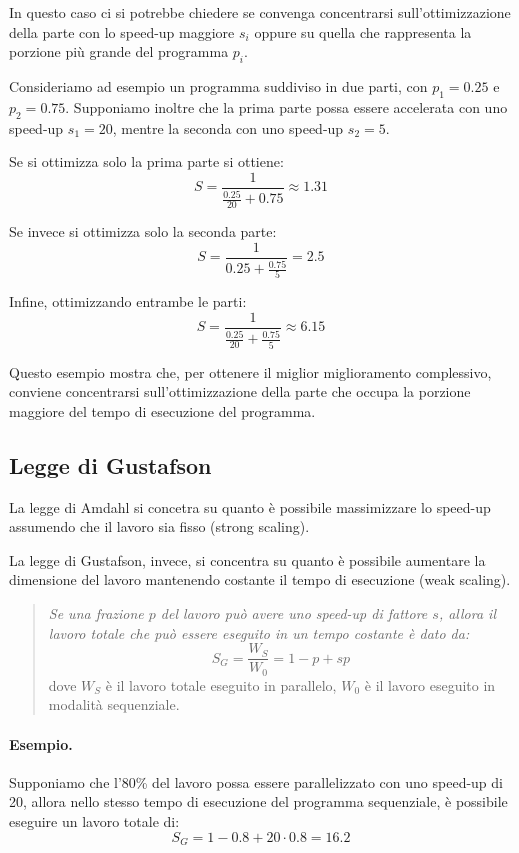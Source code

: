 In questo caso ci si potrebbe chiedere se convenga concentrarsi sull'ottimizzazione della parte con lo speed-up maggiore $s_i$ oppure su quella che rappresenta la porzione più grande del programma $p_i$.

Consideriamo ad esempio un programma suddiviso in due parti, con $p_1 = 0.25$ e $p_2 = 0.75$. Supponiamo inoltre che la prima parte possa essere accelerata con uno speed-up $s_1 = 20$, mentre la seconda con uno speed-up $s_2 = 5$.

Se si ottimizza solo la prima parte si ottiene:
\[
S = \frac{1}{\frac{0.25}{20} + 0.75} \approx 1.31
\]

Se invece si ottimizza solo la seconda parte:
\[
S = \frac{1}{0.25 + \frac{0.75}{5}} = 2.5
\]

Infine, ottimizzando entrambe le parti:
\[
S = \frac{1}{\frac{0.25}{20} + \frac{0.75}{5}} \approx 6.15
\]

Questo esempio mostra che, per ottenere il miglior miglioramento complessivo, conviene concentrarsi sull'ottimizzazione della parte che occupa la porzione maggiore del tempo di esecuzione del programma.

\subsection{Legge di Gustafson}
La legge di Amdahl si concetra su quanto è possibile massimizzare lo speed-up assumendo che il lavoro sia fisso (strong scaling).

La legge di Gustafson, invece, si concentra su quanto è possibile aumentare la dimensione del lavoro mantenendo costante il tempo di esecuzione (weak scaling).
\begin{quote}
\textit{Se una frazione $p$ del lavoro può avere uno speed-up di fattore $s$, allora il lavoro totale che può essere eseguito in un tempo costante è dato da:}
\[
S_G = \frac{W_S}{W_0} = 1 - p + sp 
\]
dove $W_S$ è il lavoro totale eseguito in parallelo, $W_0$ è il lavoro eseguito in modalità sequenziale.
\end{quote}

\paragraph{Esempio.}
Supponiamo che l'80\% del lavoro possa essere parallelizzato con uno speed-up di 20, allora nello stesso tempo di esecuzione del programma sequenziale, è possibile eseguire un lavoro totale di:
\[
S_G = 1 - 0.8 + 20 \cdot 0.8 = 16.2
\]


